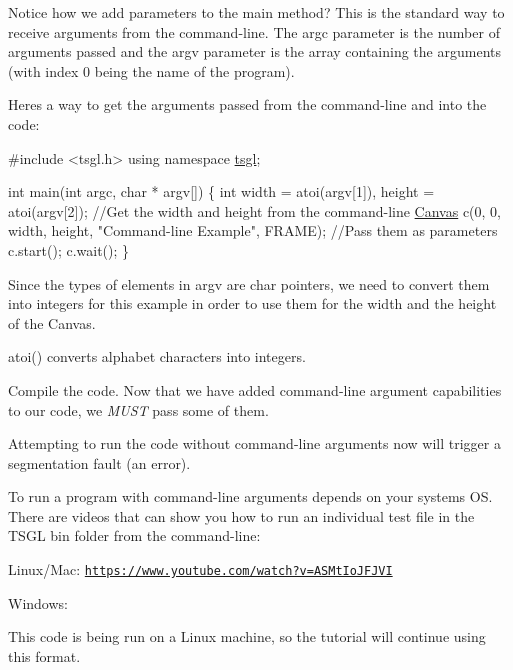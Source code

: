 Notice how we add parameters to the main method? This is the standard way to receive arguments from the command-\/line. The argc parameter is the number of arguments passed and the argv parameter is the array containing the arguments (with index 0 being the name of the program).

Here\textquotesingle{}s a way to get the arguments passed from the command-\/line and into the code\+:


\begin{DoxyCode}
\textcolor{preprocessor}{#include <tsgl.h>}
\textcolor{keyword}{using namespace }\hyperlink{namespacetsgl}{tsgl};

\textcolor{keywordtype}{int} main(\textcolor{keywordtype}{int} argc, \textcolor{keywordtype}{char} * argv[]) \{
  \textcolor{keywordtype}{int} width = atoi(argv[1]), height = atoi(argv[2]);  \textcolor{comment}{//Get the width and height from the command-line}
  \hyperlink{classtsgl_1_1_canvas}{Canvas} c(0, 0, width, height, \textcolor{stringliteral}{"Command-line Example"}, FRAME);  \textcolor{comment}{//Pass them as parameters}
  c.start();
  c.wait();
\}
\end{DoxyCode}


Since the types of elements in argv are char pointers, we need to convert them into integers for this example in order to use them for the width and the height of the Canvas.

{\ttfamily atoi()} converts alphabet characters into integers.

Compile the code. Now that we have added command-\/line argument capabilities to our code, we {\itshape M\+U\+S\+T} pass some of them.

Attempting to run the code without command-\/line arguments now will trigger a segmentation fault (an error).

To run a program with command-\/line arguments depends on your system\textquotesingle{}s O\+S. There are videos that can show you how to run an individual test file in the T\+S\+G\+L bin folder from the command-\/line\+:


\begin{DoxyItemize}
\item Linux/\+Mac\+: \href{https://www.youtube.com/watch?v=ASMtIoJFJVI}{\tt https\+://www.\+youtube.\+com/watch?v=\+A\+S\+Mt\+Io\+J\+F\+J\+V\+I}
\item Windows\+:
\end{DoxyItemize}

This code is being run on a Linux machine, so the tutorial will continue using this format.

